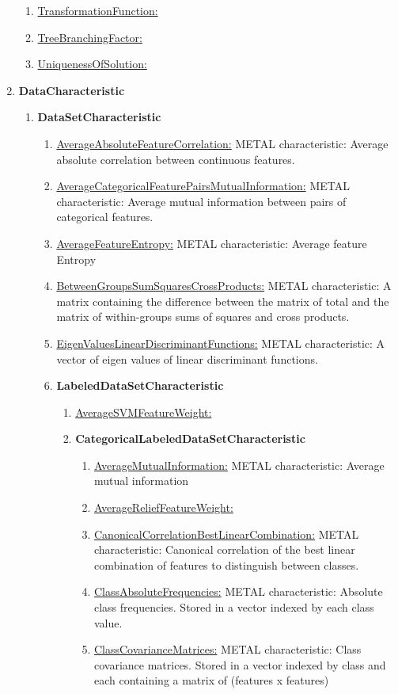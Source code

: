 \documentclass[a4paper,12pt, english]{article}
\begin{document}
\begin{enumerate}
\begin{enumerate}
	\item \underline{TransformationFunction:}
	\item \underline{TreeBranchingFactor:}
	\item \underline{UniquenessOfSolution:}	
	\end{enumerate}
\item \textbf{DataCharacteristic}
	\begin{enumerate}
	\item \textbf{DataSetCharacteristic}
		\begin{enumerate}
		\item \underline{AverageAbsoluteFeatureCorrelation:} METAL characteristic: Average absolute correlation between continuous features.
		\item \underline{AverageCategoricalFeaturePairsMutualInformation:}  METAL characteristic: Average mutual information between pairs of categorical features. 
		\item \underline{AverageFeatureEntropy:} METAL characteristic: Average feature Entropy
		\item \underline{BetweenGroupsSumSquaresCrossProducts:} METAL characteristic: A matrix containing the difference between the matrix of total and the matrix of within-groups sums of squares and cross products.
		\item \underline{EigenValuesLinearDiscriminantFunctions:} METAL characteristic: A vector of eigen values of linear discriminant functions.
		\item \textbf{LabeledDataSetCharacteristic}
			\begin{enumerate}
			\item \underline{AverageSVMFeatureWeight:}
			\item \textbf{CategoricalLabeledDataSetCharacteristic}
				\begin{enumerate}
				\item \underline{AverageMutualInformation:} METAL characteristic: Average mutual information 
				\item \underline{AverageReliefFeatureWeight:}
				\item \underline{CanonicalCorrelationBestLinearCombination:} METAL characteristic: Canonical correlation of the best linear combination of features to distinguish between classes.
				\item \underline{ClassAbsoluteFrequencies:} METAL characteristic: Absolute class frequencies. Stored in a vector indexed by each class value.
				\item \underline{ClassCovarianceMatrices:} METAL characteristic: Class covariance matrices. Stored in a vector indexed by class and each containing a matrix of (features x features)

\end{enumerate}
\end{enumerate}
\end{enumerate}
\end{enumerate}
\end{enumerate}
\end{document}
